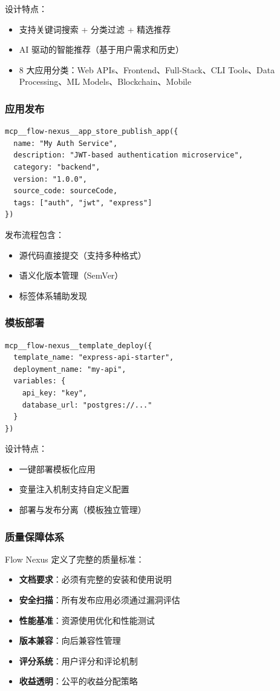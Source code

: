 \documentclass[11pt,a4paper]{article}
\begin{document}
设计特点：
\begin{itemize}
  \item 支持关键词搜索 + 分类过滤 + 精选推荐
  \item AI 驱动的智能推荐（基于用户需求和历史）
  \item 8 大应用分类：Web APIs、Frontend、Full-Stack、CLI Tools、Data Processing、ML Models、Blockchain、Mobile
\end{itemize}

\subsubsection{应用发布}
\begin{lstlisting}[caption={MCP 工具调用示例：发布应用}]
mcp__flow-nexus__app_store_publish_app({
  name: "My Auth Service",
  description: "JWT-based authentication microservice",
  category: "backend",
  version: "1.0.0",
  source_code: sourceCode,
  tags: ["auth", "jwt", "express"]
})
\end{lstlisting}

发布流程包含：
\begin{itemize}
  \item 源代码直接提交（支持多种格式）
  \item 语义化版本管理（SemVer）
  \item 标签体系辅助发现
\end{itemize}

\subsubsection{模板部署}
\begin{lstlisting}[caption={MCP 工具调用示例：部署模板}]
mcp__flow-nexus__template_deploy({
  template_name: "express-api-starter",
  deployment_name: "my-api",
  variables: {
    api_key: "key",
    database_url: "postgres://..."
  }
})
\end{lstlisting}

设计特点：
\begin{itemize}
  \item 一键部署模板化应用
  \item 变量注入机制支持自定义配置
  \item 部署与发布分离（模板独立管理）
\end{itemize}

\subsubsection{质量保障体系}
Flow Nexus 定义了完整的质量标准：
\begin{itemize}
  \item \textbf{文档要求}：必须有完整的安装和使用说明
  \item \textbf{安全扫描}：所有发布应用必须通过漏洞评估
  \item \textbf{性能基准}：资源使用优化和性能测试
  \item \textbf{版本兼容}：向后兼容性管理
  \item \textbf{评分系统}：用户评分和评论机制
  \item \textbf{收益透明}：公平的收益分配策略
\end{itemize}
\end{document}
